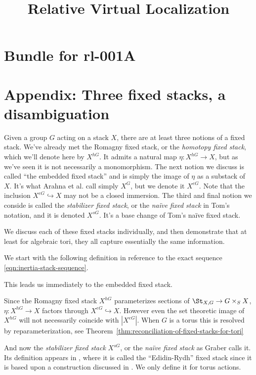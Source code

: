 \documentclass[12pt,dvipsnames]{amsart}
\title{Relative Virtual Localization}
\begin{document}
\section*{Bundle for rl-001A}

\section{Appendix: Three fixed stacks, a disambiguation}\label{rl-001A}

Given a group \(G\) acting on a stack \(X\), there are at least three notions of a fixed stack. We've already met the Romagny fixed stack, or the \emph{homotopy fixed stack}, which we'll denote here by \(X^{hG}\). It admits a natural map \(\eta:X^{hG}\to X\), but as we've seen it is not necessarily a monomorphism. The next notion we discuss is called ``the embedded fixed stack'' and is simply the image of $\eta$ as a substack of $X$. It's what Arahna et al. call simply $X^G$, but we denote it \(X^{eG}\). Note that the inclusion \(X^{eG}\hookrightarrow X\) may not be a closed immersion. The third and final notion we conside is called the \textit{stabilizer fixed stack}, or the \textit{na\"ive fixed stack} in Tom's notation, and it is denoted \(X^{sG}\). It's a base change of Tom's na\"ive fixed stack.

We discuss each of these fixed stacks individually, and then demonstrate that at least for algebraic tori, they all capture essentially the same information.

We start with the following definition in reference to the exact sequence \eqref{eqn:inertia-stack-sequence}.


This leads us immediately to the embedded fixed stack.




Since the Romagny fixed stack $X^{hG}$ parameterizes sections of \(\St_{X,G} \to G\times_SX\), \(\eta:X^{hG} \to X\) factors through \(X^{eG}\hookrightarrow X\). However even the set theoretic image of \(X^{hG}\) will not necessarily coincide with \(|X^{eG}|\). When \(G\) is a torus this is resolved by reparameterization, see Theorem~\ref{thm:reconciliation-of-fixed-stacks-for-tori}


And now the \textit{stabilizer fixed stack} \(X^{sG}\), or the \textit{na\"ive fixed stack} as Graber calls it. Its definition appears in \cite{aranha-khan-latyntsev-etal_VirtualLocalizationRevisited2025}, where it is called the ``Edidin-Rydh'' fixed stack since it is based upon a construction discussed in \cite{edidin-rydh_CanonicalReductionStabilizers2021}. We only define it for torus actions.
\end{document}
